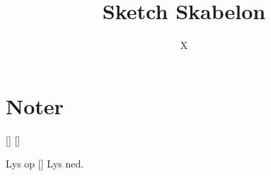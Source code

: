 \documentclass{article}
\title{Sketch Skabelon}
\author{X}
\begin{document}
                
\maketitle
\section*{Noter}                %
\begin{roles}
[]
 []
\end{roles}

\begin{props}

\prop{} 
\end{props}

\newpage%
\begin{sketch}

\scene Lys op
\says{}[]
\act{}
\scene Lys ned.

\end{sketch}
\end{document}
